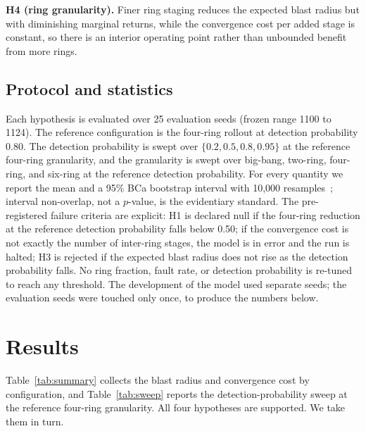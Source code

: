 \documentclass[journal]{IEEEtran}
\begin{document}
\textbf{H4 (ring granularity).} Finer ring staging reduces the expected blast radius but with
diminishing marginal returns, while the convergence cost per added stage is constant, so there is an
interior operating point rather than unbounded benefit from more rings.

\subsection{Protocol and statistics}
Each hypothesis is evaluated over 25 evaluation seeds (frozen range 1100 to 1124). The reference
configuration is the four-ring rollout at detection probability 0.80. The detection probability is
swept over $\{0.2, 0.5, 0.8, 0.95\}$ at the reference four-ring granularity, and the granularity is
swept over big-bang, two-ring, four-ring, and six-ring at the reference detection probability. For
every quantity we report the mean and a 95\% BCa bootstrap interval with 10{,}000
resamples~\cite{efron1987bca,efron1994introduction}; interval non-overlap, not a $p$-value, is the
evidentiary standard. The pre-registered failure criteria are explicit: H1 is declared null if the
four-ring reduction at the reference detection probability falls below 0.50; if the convergence cost
is not exactly the number of inter-ring stages, the model is in error and the run is halted; H3 is
rejected if the expected blast radius does not rise as the detection probability falls. No ring
fraction, fault rate, or detection probability is re-tuned to reach any threshold. The development of
the model used separate seeds; the evaluation seeds were touched only once, to produce the numbers
below.

\section{Results}
Table~\ref{tab:summary} collects the blast radius and convergence cost by configuration, and
Table~\ref{tab:sweep} reports the detection-probability sweep at the reference four-ring granularity.
All four hypotheses are supported. We take them in turn.

\begin{table}[t]
\centering
\caption{Expected blast radius and convergence cost by rollout configuration (mean over 25 seeds,
detection probability 0.80).}
\label{tab:summary}
\footnotesize
\setlength{\tabcolsep}{5pt}
\end{table}
\end{document}
